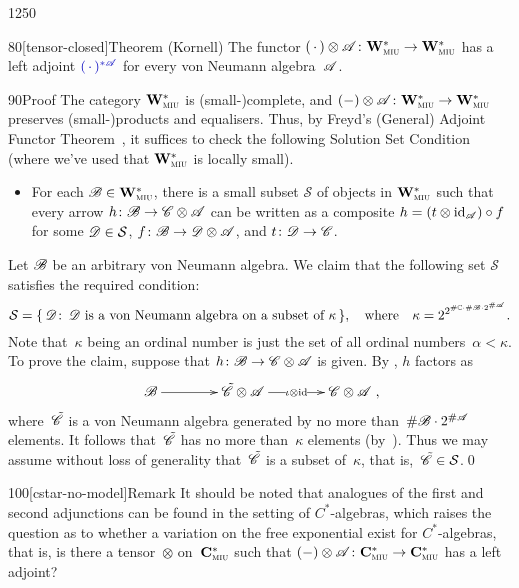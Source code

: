 \begin{parsec}{1250}
\begin{point}{80}[tensor-closed]{Theorem (Kornell)}%
The functor $(\,\cdot\,)\otimes\mathscr{A}\colon\mathbf{W}^*_{\text{\textsc{miu}}}\to\mathbf{W}^*_{\text{\textsc{miu}}}$
has a left adjoint
    $\Define{(\,\cdot\,)^{*\scrA}}$
for every von Neumann algebra~$\mathscr{A}$.
\begin{point}{90}{Proof}%
	The category $\mathbf{W}^*_{\text{\textsc{miu}}}$ is (small-)complete,
and
$(-)\otimes\mathscr{A}\colon\mathbf{W}^*_{\text{\textsc{miu}}}\to\mathbf{W}^*_{\text{\textsc{miu}}}$
preserves (small-)products and equalisers.
Thus,
by Freyd's (General)
Adjoint Functor Theorem~\cite[Thm.~V.6.2]{maclane},
it suffices to check the following Solution Set Condition
(where we've used that $\mathbf{W}^*_{\text{\textsc{miu}}}$
is locally small).
\begin{itemize}
\item
	For each $\mathscr{B}\in\mathbf{W}^*_{\text{\textsc{miu}}}$, there is a small subset $\mathcal{S}$ of objects in $\mathbf{W}^*_{\text{\textsc{miu}}}$
such that every arrow $h\colon \mathscr{B}\to\mathscr{C}\otimes\mathscr{A}$
can be written as a composite $h=(t\otimes\mathrm{id}_{\mathscr{A}})\circ f$ for some $\mathscr{D}\in \mathcal{S}$,
$f\colon\mathscr{B}\to\mathscr{D}\otimes \mathscr{A}$, and $t\colon \mathscr{D}\to\mathscr{C}$.
\end{itemize}
Let $\mathscr{B}$ be an arbitrary von Neumann algebra.
We claim that the following set $\mathcal{S}$ satisfies the required condition:
\[
	\mathcal{S}=
\{\,\mathscr{D}\colon\,
    \text{$\mathscr{D}$ is a von Neumann algebra on a subset of~$\kappa$}\,\},
\quad\text{where}\quad\kappa=2^{2^{\#\mathbb{C}\cdot\#\mathscr{B}\cdot2^{\#\mathscr{A}}}}.
\]
Note that~$\kappa$
being an ordinal number
is just the set of all ordinal numbers~$\alpha<\kappa$.
To prove the claim,
suppose that $h\colon \mathscr{B}\to\mathscr{C}\otimes\mathscr{A}$ is given.
By ,
$h$ factors
as
\begin{equation*}
	\xymatrix@C=4em{\scrB\ar[r] & \tilde\scrC\otimes 
\scrA\ar[r]|-{\iota\otimes \id} & \scrC\otimes\scrA },
\end{equation*}
where~$\tilde{\mathscr{C}}$
is a von Neumann algebra
generated by no more than~$\#\mathscr{B}\cdot2^{\#\mathscr{A}}$
elements.
It follows that~$\tilde{\mathscr{C}}$ has no
more than~$\kappa$ elements (by~).
Thus we may assume without loss of generality
that~$\tilde{\mathscr{C}}$
is a subset of~$\kappa$,
that is,~$\tilde{\mathscr{C}}\in\mathcal{S}$.\qed
\end{point}
\end{point}
\begin{point}{100}[cstar-no-model]{Remark}%
It should be noted that analogues
of the first and second adjunctions
can be found in the setting of $C^*$-algebras,
which raises the question as to whether
a variation on the free exponential exist for $C^*$-algebras,
that is, is there a tensor~$\otimes$ on~$\mathbf{C}^*_{\text{\textsc{miu}}}$
such that $(-)\otimes \mathscr{A}\colon
\mathbf{C}^*_{\text{\textsc{miu}}}\to\mathbf{C}^*_{\text{\textsc{miu}}}$
has a left adjoint?


\end{point}
\end{parsec}
